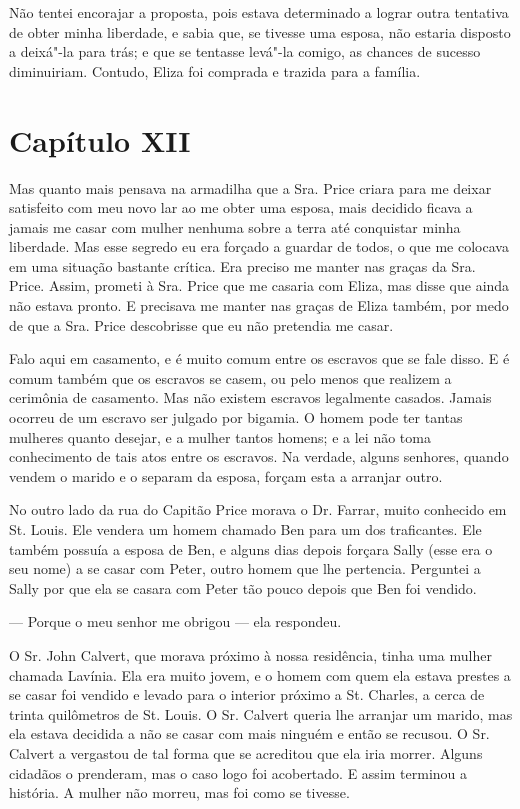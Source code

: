 Não tentei encorajar a proposta, pois estava determinado a lograr outra
tentativa de obter minha liberdade, e sabia que, se tivesse uma esposa,
não estaria disposto a deixá"-la para trás; e que se tentasse levá"-la
comigo, as chances de sucesso diminuiriam. Contudo, Eliza foi comprada e
trazida para a família.

\chapter{Capítulo XII}

Mas quanto mais pensava na armadilha que a Sra. Price criara para me
deixar satisfeito com meu novo lar ao me obter uma esposa, mais decidido
ficava a jamais me casar com mulher nenhuma sobre a terra até conquistar
minha liberdade. Mas esse segredo eu era forçado a guardar de todos, o
que me colocava em uma situação bastante crítica. Era preciso me manter
nas graças da Sra. Price. Assim, prometi à Sra. Price que me casaria com
Eliza, mas disse que ainda não estava pronto. E precisava me manter nas
graças de Eliza também, por medo de que a Sra. Price descobrisse que eu
não pretendia me casar.

Falo aqui em casamento, e é muito comum entre os escravos que se fale
disso. E é comum também que os escravos se casem, ou pelo menos que
realizem a cerimônia de casamento. Mas não existem escravos legalmente
casados. Jamais ocorreu de um escravo ser julgado por bigamia. O homem
pode ter tantas mulheres quanto desejar, e a mulher tantos homens; e a
lei não toma conhecimento de tais atos entre os escravos. Na verdade,
alguns senhores, quando vendem o marido e o separam da esposa, forçam
esta a arranjar outro.

No outro lado da rua do Capitão Price morava o Dr. Farrar, muito
conhecido em St. Louis. Ele vendera um homem chamado Ben para um dos
traficantes. Ele também possuía a esposa de Ben, e alguns dias depois
forçara Sally (esse era o seu nome) a se casar com Peter, outro homem
que lhe pertencia. Perguntei a Sally por que ela se casara com Peter tão
pouco depois que Ben foi vendido.

--- Porque o meu senhor me obrigou --- ela respondeu.

O Sr. John Calvert, que morava próximo à nossa residência, tinha uma
mulher chamada Lavínia. Ela era muito jovem, e o homem com quem ela
estava prestes a se casar foi vendido e levado para o interior próximo a
St. Charles, a cerca de trinta quilômetros de St. Louis. O Sr. Calvert
queria lhe arranjar um marido, mas ela estava decidida a não se casar
com mais ninguém e então se recusou. O Sr. Calvert a vergastou de tal
forma que se acreditou que ela iria morrer. Alguns cidadãos o prenderam,
mas o caso logo foi acobertado. E assim terminou a história. A mulher
não morreu, mas foi como se tivesse.

